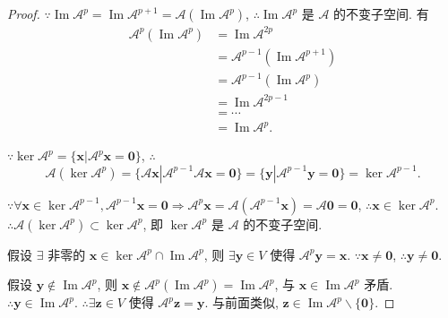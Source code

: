 \documentclass{ctexart}
\begin{document}
\begin{proof}
    $\because\operatorname{Im}\mathcal{A}^p=\operatorname{Im}\mathcal{A}^{p+1}=\mathcal{A}(\operatorname{Im}\mathcal{A}^p)$, $\therefore\operatorname{Im}\mathcal{A}^p$ 是 $\mathcal{A}$ 的不变子空间. 有
    \begin{align*}
        \mathcal{A}^p(\operatorname{Im}\mathcal{A}^p) & =\operatorname{Im}\mathcal{A}^{2p} \\
        & =\mathcal{A}^{p-1}(\operatorname{Im}\mathcal{A}^{p+1}) \\
        & =\mathcal{A}^{p-1}(\operatorname{Im}\mathcal{A}^p) \\
        & =\operatorname{Im}\mathcal{A}^{2p-1} \\
        & =\cdots \\
        & =\operatorname{Im}\mathcal{A}^p.
    \end{align*}

    $\because\ker\mathcal{A}^p=\{\boldsymbol{x}|\mathcal{A}^p\boldsymbol{x}=\boldsymbol{0}\}$, $\therefore$
    \begin{equation}\label{ex3.3eq}
        \mathcal{A}(\ker\mathcal{A}^p)=\{\mathcal{A}\boldsymbol{x}|\mathcal{A}^{p-1}\mathcal{A}\boldsymbol{x}=\boldsymbol{0}\}=\{\boldsymbol{y}|\mathcal{A}^{p-1}\boldsymbol{y}=\boldsymbol{0}\}=\ker\mathcal{A}^{p-1}.
    \end{equation}

    $\because\forall\boldsymbol{x}\in\ker\mathcal{A}^{p-1},\mathcal{A}^{p-1}\boldsymbol{x}=\boldsymbol{0}\Rightarrow\mathcal{A}^p\boldsymbol{x}=\mathcal{A}(\mathcal{A}^{p-1}\boldsymbol{x})=\mathcal{A}\boldsymbol{0}=\boldsymbol{0}$, $\therefore\boldsymbol{x}\in\ker\mathcal{A}^p$. $\therefore\mathcal{A}(\ker\mathcal{A}^p)\subset\ker\mathcal{A}^p$, 即 $\ker\mathcal{A}^p$ 是 $\mathcal{A}$ 的不变子空间.

    假设 $\exists$ 非零的 $\boldsymbol{x}\in\ker\mathcal{A}^p\cap\operatorname{Im}\mathcal{A}^p$, 则 $\exists\boldsymbol{y}\in V$ 使得 $\mathcal{A}^p\boldsymbol{y}=\boldsymbol{x}$. $\because\boldsymbol{x}\neq\boldsymbol{0}$, $\therefore\boldsymbol{y}\neq\boldsymbol{0}$.

    假设 $\boldsymbol{y}\notin\operatorname{Im}\mathcal{A}^p$, 则 $\boldsymbol{x}\notin\mathcal{A}^p(\operatorname{Im}\mathcal{A}^p)=\operatorname{Im}\mathcal{A}^p$, 与 $\boldsymbol{x}\in\operatorname{Im}\mathcal{A}^p$ 矛盾. $\therefore\boldsymbol{y}\in\operatorname{Im}\mathcal{A}^p$. $\therefore\exists\boldsymbol{z}\in V$ 使得 $\mathcal{A}^p\boldsymbol{z}=\boldsymbol{y}$. 与前面类似, $\boldsymbol{z}\in\operatorname{Im}\mathcal{A}^p\backslash\{\boldsymbol{0}\}$.


\end{proof}
\end{document}
